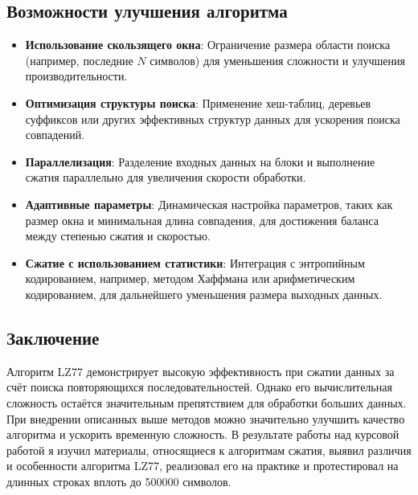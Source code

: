 \subsection*{Возможности улучшения алгоритма}
\begin{itemize}
    \item \textbf{Использование скользящего окна}: Ограничение размера области поиска (например, последние $N$ символов) для уменьшения сложности и улучшения производительности.
    \item \textbf{Оптимизация структуры поиска}: Применение хеш-таблиц, деревьев суффиксов или других эффективных структур данных для ускорения поиска совпадений.
    \item \textbf{Параллелизация}: Разделение входных данных на блоки и выполнение сжатия параллельно для увеличения скорости обработки.
    \item \textbf{Адаптивные параметры}: Динамическая настройка параметров, таких как размер окна и минимальная длина совпадения, для достижения баланса между степенью сжатия и скоростью.
    \item \textbf{Сжатие с использованием статистики}: Интеграция с энтропийным кодированием, например, методом Хаффмана или арифметическим кодированием, для дальнейшего уменьшения размера выходных данных.
\end{itemize}

\subsection*{Заключение}
Алгоритм LZ77 демонстрирует высокую эффективность при сжатии данных за счёт поиска повторяющихся последовательностей. Однако его вычислительная сложность остаётся значительным препятствием для обработки больших данных. При внедрении описанных выше методов можно значительно улучшить качество алгоритма и ускорить временную сложность.
В результате работы над курсовой работой я изучил материалы, относящиеся к алгоритмам сжатия, выявил различия и особенности алгоритма LZ77, реализовал его на практике и протестировал на длинных строках вплоть до 500000 символов.